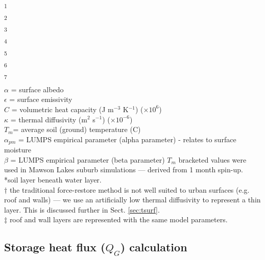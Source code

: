 \documentclass[gmd, manuscript]{copernicus}
\begin{document}
\begin{table}
\begin{center}
\begin{tabular}{  p{2.5cm} p{1.3cm} p{1.3cm} p{1.3cm} p{1.3cm} p{1.3cm} p{1.3cm} p{1.3cm} p{1.3cm} p{1.3cm}}
\hline
  \end{tabular}
  \end{center}
\footnotesize{\textsuperscript{1} \cite{Oke1987z}\\}
\footnotesize{\textsuperscript{2} \cite{stewart2014evaluation}\\}
\footnotesize{\textsuperscript{3} \cite{Jarvi2014a} \\}
\footnotesize{\textsuperscript{4} \cite{Narita1984} \\ }
\footnotesize{\textsuperscript{5} \cite{Asaeda1993}  \\}
\footnotesize{\textsuperscript{6} \cite{Grimmond1993}\\}
\footnotesize{\textsuperscript{7} \cite{Doll1985}\\}
\footnotesize{\ensuremath{\alpha} = surface albedo \\}
\footnotesize{\ensuremath{\epsilon} = surface emissivity \\}
\footnotesize{\ensuremath{C} = volumetric heat capacity (J m$^{-3}$ K$^{-1}$) ($\times10^{6}$) \\ }
\footnotesize{\ensuremath{\kappa} = thermal diffusivity (m$^{2}$ s$^{-1}$) ($\times10^{-6}$) \\}
\footnotesize{\ensuremath{T_{m}}= average soil (ground) temperature (\degree C)\\}
\footnotesize{\ensuremath{\alpha_{pm}} = LUMPS empirical parameter (alpha parameter) - relates to surface moisture \\}
\footnotesize{\ensuremath{\beta} = LUMPS empirical parameter (beta parameter)}
\footnotesize{\ensuremath{T_{m}} bracketed values were used in Mawson Lakes suburb simulations --- derived from 1 month spin-up.}\\
\footnotesize{*soil layer beneath water layer.} \\
\footnotesize{$\dagger$ the traditional force-restore method is not well suited to urban surfaces (e.g. roof and walls)  --- we use an artificially low thermal diffusivity to represent a thin layer. This is discussed further in Sect. \ref{sec:tsurf}.} \\
$\ddagger$ roof and wall layers are represented with the same model parameters. 
\end{table} 

\subsection{Storage heat flux ($Q_{G}$) calculation}\label{sec:lumps}
\end{document}

